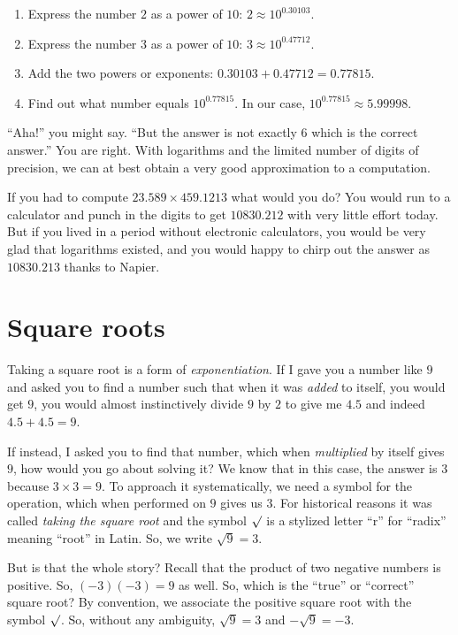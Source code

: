 \documentclass[
  a4paper,
]{article}
\begin{document}
\begin{enumerate}
\item
  Express the number \(2\) as a power of \(10\):
  \(2 \approx 10^{0.30103}\).
\item
  Express the number \(3\) as a power of \(10\):
  \(3 \approx 10^{0.47712}\).
\item
  Add the two powers or exponents: \(0.30103 + 0.47712 = 0.77815\).
\item
  Find out what number equals \(10^{0.77815}\). In our case,
  \(10^{0.77815} \approx 5.99998\).
\end{enumerate}

``Aha!'' you might say. ``But the answer is not exactly \(6\) which is
the correct answer.'' You are right. With logarithms and the limited
number of digits of precision, we can at best obtain a very good
approximation to a computation.

If you had to compute \(23.589 \times 459.1213\) what would you do? You
would run to a calculator and punch in the digits to get \(10830.212\)
with very little effort today. But if you lived in a period without
electronic calculators, you would be very glad that logarithms existed,
and you would happy to chirp out the answer as \(10830.213\) thanks to
Napier.

\hypertarget{square-roots}{%
\section{Square roots}\label{square-roots}}

Taking a square root is a form of \emph{exponentiation}. If I gave you a
number like \(9\) and asked you to find a number such that when it was
\emph{added} to itself, you would get \(9\), you would almost
instinctively divide \(9\) by \(2\) to give me \(4.5\) and indeed
\(4.5 + 4.5 = 9\).

If instead, I asked you to find that number, which when
\emph{multiplied} by itself gives \(9\), how would you go about solving
it? We know that in this case, the answer is \(3\) because
\(3 \times 3 = 9\). To approach it systematically, we need a symbol for
the operation, which when performed on \(9\) gives us \(3\). For
historical reasons it was called \emph{taking the square root} and the
symbol \(\surd\) is a stylized letter ``r'' for ``radix'' meaning
``root'' in Latin. So, we write \(\sqrt{9} = 3\).

But is that the whole story? Recall that the product of two negative
numbers is positive. So, \((-3)(-3) = 9\) as well. So, which is the
``true'' or ``correct'' square root? By convention, we associate the
positive square root with the symbol \(\surd\). So, without any
ambiguity, \(\sqrt{9} = 3\) and \(-\sqrt{9} = -3\).
\end{document}
